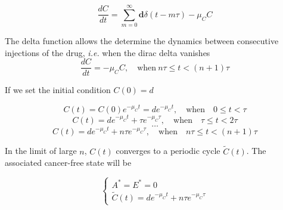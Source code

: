 \[ \frac{dC}{dt} = \sum_{m=0}^\infty \mathbf{d} \delta (t-m\tau) -\mu_C C \]

The delta function allows the determine the dynamics between consecutive injections of the drug, \textit{i.e.} when the dirac delta vanishes
\[ \frac{dC}{dt} = -\mu_C C, \quad \text{when} \ n\tau \leq t < (n+1)\tau  \]

If we set the initial condition $C(0) = d$

\[ C(t) = C(0) e^{-\mu_C t} = d e^{-\mu_C t}, \quad \text{when} \quad 0 \leq t < \tau \]
\[C(t) = d e^{-\mu_C t} + \tau e^{-\mu_C \tau}, \quad \text{when} \quad \tau \leq t < 2\tau \] 
\[\dots\]
\[ C(t) = d e^{-\mu_C t} + n\tau e^{-\mu_C \tau}, \quad \text{when} \quad n\tau \leq t < (n+1)\tau \]

In the limit of large $n$, $C(t)$ converges to a periodic cycle $\tilde{C}(t)$. The associated cancer-free state will be

\[ \begin{cases}
	A^* = E^* = 0 \\ 
	\tilde{C}(t) =  d e^{-\mu_C t} + n\tau e^{-\mu_C \tau} 
\end{cases} \]
